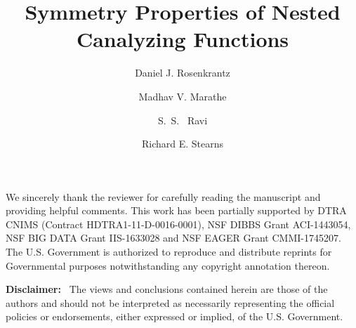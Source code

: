 \documentclass[
submission
]{dmtcs-episciences}
\author{Daniel J. Rosenkrantz\affiliationmark{1}
  \and Madhav V. Marathe\affiliationmark{2}%
  \and S.~S.~ Ravi\affiliationmark{1}%
  \and Richard E. Stearns\affiliationmark{1}
}
\title[Symmetry and NCFs]
      {Symmetry Properties of Nested Canalyzing Functions}
\affiliation{
  Biocomplexity Institute and Initiative, University of Virginia and
  Department of Computer Science, University at Albany 
  -- State University of New York, USA\\
  Biocomplexity Institute and Initiative \& Department of 
  Computer Science, University of Virginia, USA
}
\begin{document}
\maketitle




\newcommand{\QED}{\hfill\rule{2mm}{2mm}}

\newcommand{\cpoly}{\textbf{P}}
\newcommand{\cnp}{\textbf{NP}}
\newcommand{\cnump}{\textbf{\#P}}
\newcommand{\wtg}{\mbox{$\mathcal{G}$}}

\newcommand{\arr}{\mbox{$\:\longrightarrow\:$}}

\smallskip

\begin{abstract}

\end{abstract}






\acknowledgments
We sincerely thank the reviewer for carefully
reading the manuscript and providing helpful comments.
This work has been partially supported by
DTRA CNIMS (Contract HDTRA1-11-D-0016-0001),
NSF DIBBS Grant ACI-1443054, 
NSF BIG DATA Grant IIS-1633028 and
NSF EAGER Grant CMMI-1745207.
The U.S. Government is authorized to reproduce and
distribute reprints for Governmental purposes notwithstanding
any copyright annotation thereon.

\bigskip%

\medskip

\noindent
\textbf{Disclaimer:}~ The views and conclusions contained
herein are those of the authors and should
not be interpreted as necessarily representing the
official policies or endorsements, either expressed
or implied, of the U.S. Government.



%

\end{document}
